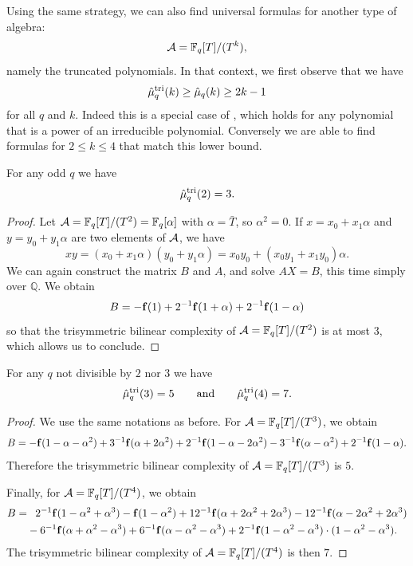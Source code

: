 Using the same strategy, we can also find universal formulas for another type of
algebra:
\[
  \mathcal{A} = \mathbb{F}_{q}[T]/(T^k),
\]
namely the truncated polynomials. In that context, we first observe that we
have
\[
  \hat\mu^{\textrm{tri}}_q(k)\geq\hat\mu_q(k)\geq2k-1
\]
for all $q$ and $k$. Indeed this is a special case of
\cite[Thm.~4]{Winograd77}, which holds for any polynomial that is a power of an
irreducible polynomial. Conversely we are able to find formulas for $2\leq k
\leq 4$ that match this lower bound.

\begin{prop}For any odd $q$ we have
\[
  \hat\mu^{\textrm{tri}}_q(2) = 3.
\]
\end{prop}
\begin{proof}
Let $\mathcal{A} = \mathbb{F}_{q}[T]/(T^2) = \mathbb{F}_q[\alpha]$ with $\alpha=\bar T$, so $\alpha^2=0$.
If $x = x_0 + x_1\alpha$ and $y = y_0 + y_1\alpha$ are two elements of
$\mathcal{A}$, we have
\[
  xy = (x_0+x_1\alpha)(y_0+y_1\alpha)=x_0y_0+
  (x_0y_1+x_1y_0)\alpha.
\]
We can again construct the matrix $B$ and $A$, and solve $AX=B$, this time
simply over
$\mathbb{Q}$. We obtain
\[
  B = -\mathbf{f}(1) + 2^{-1}\mathbf{f}(1+\alpha)+2^{-1}\mathbf{f}(1-\alpha)
\]
so that the trisymmetric bilinear complexity of
$\mathcal{A}=\mathbb{F}_q[T]/(T^2)$ is at most $3$, which allows us to conclude.
\end{proof}
\begin{prop}For any $q$ not divisible by $2$ nor $3$ we have
\[
  \hat\mu^{\textrm{tri}}_q(3) = 5\qquad\textrm{and}\qquad\hat\mu^{\textrm{tri}}_q(4) = 7.
\]
\end{prop}
\begin{proof}
We use the same notations as before. For
$\mathcal{A}=\mathbb{F}_{q}[T]/(T^3)$, we obtain
\[
  B =
  -\mathbf{f}(1-\alpha-\alpha^2)+3^{-1}\mathbf{f}(\alpha+2\alpha^2)
  +2^{-1}\mathbf{f}(1-\alpha-2\alpha^2) -
  3^{-1}\mathbf{f}(\alpha-\alpha^2)
  +2^{-1}\mathbf{f}(1-\alpha).
\]
Therefore the trisymmetric bilinear complexity of
$\mathcal{A}=\mathbb{F}_q[T]/(T^3)$ is $5$.

Finally, for $\mathcal{A}=\mathbb{F}_{q}[T]/(T^4)$, we obtain
\begin{equation*}
  \begin{split}
    B =&\phantom{-}2^{-1}\mathbf{f}(1-\alpha^2+\alpha^3)-\mathbf{f}(1-\alpha^2)
  +12^{-1}\mathbf{f}(\alpha+2\alpha^2+2\alpha^3)
  -12^{-1}\mathbf{f}(\alpha-2\alpha^2+2\alpha^3)\\
  &-6^{-1}\mathbf{f}(\alpha+\alpha^2-\alpha^3)
  +6^{-1}\mathbf{f}(\alpha-\alpha^2-\alpha^3)
  +2^{-1}\mathbf{f}(1-\alpha^2-\alpha^3)\cdot(1-\alpha^2-\alpha^3).
  \end{split}
\end{equation*}
The trisymmetric bilinear complexity of $\mathcal{A}=\mathbb{F}_q[T]/(T^4)$ is then $7$.
\end{proof}

